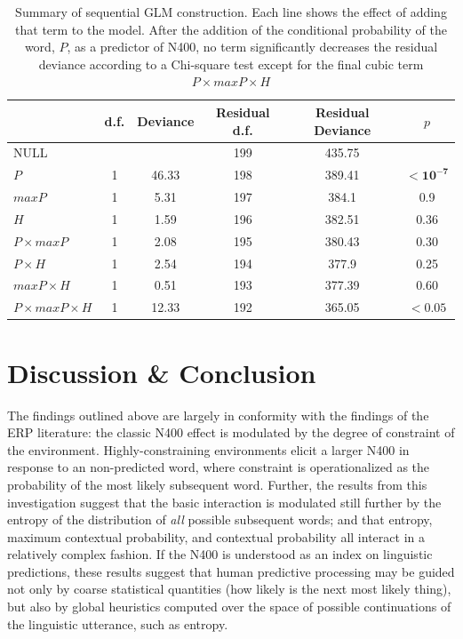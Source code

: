 \documentclass{article}
\begin{document}
\begin{table}
	\centering
	\begin{tabular}{l|ccccc}
							&	d.f.	&	Deviance	&	Residual d.f.	&	 Residual Deviance	&	$p$\\
                        \hline             
NULL					&				&				&	199				&	435.75\\
$P$						&	1			&	46.33		&	198				&	389.41				&	$\mathbf{<10^{-7}}$\\
$maxP$					&	1			&	5.31		&	197				&	384.1				&	0.9\\
$H$						&	1			&	1.59		&	196				&	382.51				&	0.36\\
$P\times{}maxP$			&	1			&	2.08		&	195				&	380.43				&	0.30\\
$P\times{}H$			&	1			&	2.54		&	194				&	377.9				&	0.25\\
$maxP\times{}H$			&	1			&	0.51		&	193				&	377.39				&	0.60\\
$P\times{}maxP\times{}H$&	1			&	12.33		&	192				&	365.05				&	$\mathbf{<0.05}$
	\end{tabular}
    \caption{Summary of sequential GLM construction. Each line shows the effect of adding that term to the model. After the addition of the conditional probability of the word, $P$, as a predictor of N400, no term significantly decreases the residual deviance according to a Chi-square test except for the final cubic term $P\times{}maxP\times{}H$ 
    \label{tab_seq}}
\end{table}


\section{Discussion \& Conclusion}

The findings outlined above are largely in conformity with the findings of the ERP literature: the classic N400 effect is modulated by the degree of constraint of the environment. Highly-constraining environments elicit a larger N400 in response to an non-predicted word, where constraint is operationalized as the probability of the most likely subsequent word. Further, the results from this investigation suggest that the basic interaction is modulated still further by the entropy of the distribution of \emph{all} possible subsequent words; and that entropy, maximum contextual probability, and contextual probability all interact in a relatively complex fashion. If the N400 is understood as an index on linguistic predictions, these results suggest that human predictive processing may be guided not only by coarse statistical quantities (how likely is the next most likely thing), but also by global heuristics computed over the space of possible continuations of the linguistic utterance, such as entropy. 
\end{document}
